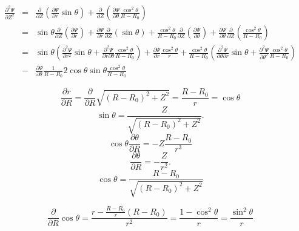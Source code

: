 \documentclass{article}
\begin{document}
\begin{eqnarray}
  \frac{\partial^2 \Psi}{\partial Z^2} & = & \frac{\partial}{\partial Z}
  \left( \frac{\partial \Psi}{\partial r} \sin \theta \right) +
  \frac{\partial}{\partial Z} \left( \frac{\partial \Psi}{\partial \theta} 
  \frac{\cos^2 \theta}{R - R_0} \right) \nonumber\\
  & = & \sin \theta \frac{\partial}{\partial Z} \left( \frac{\partial
  \Psi}{\partial r} \right) + \frac{\partial \Psi}{\partial r} 
  \frac{\partial}{\partial Z} (\sin \theta) + \frac{\cos^2 \theta}{R - R_0} 
  \frac{\partial}{\partial Z} \left( \frac{\partial \Psi}{\partial \theta} 
  \right) + \frac{\partial \Psi}{\partial \theta} \frac{\partial}{\partial Z}
  \left( \frac{\cos^2 \theta}{R - R_0} \right) \nonumber\\
  & = & \sin \theta \left( \frac{\partial^2 \Psi}{\partial r^2} \sin \theta +
  \frac{\partial^2 \Psi}{\partial r \partial \theta}  \frac{\cos^2 \theta}{R -
  R_0} \right) + \frac{\partial \Psi}{\partial r}  \frac{\cos^2 \theta}{r} +
  \frac{\cos^2 \theta}{R - R_0}  \left( \frac{\partial^2 \Psi}{\partial \theta
  \partial r} \sin \theta + \frac{\partial^2 \Psi}{\partial \theta^2} 
  \frac{\cos^2 \theta}{R - R_0} \right) \nonumber\\
  & - & \frac{\partial \Psi}{\partial \theta}  \frac{1}{R - R_0} 2 \cos
  \theta \sin \theta \frac{\cos^2 \theta}{R - R_0}  \label{9-17-e1}
\end{eqnarray}



\begin{equation}
  \frac{\partial r}{\partial R} = \frac{\partial}{\partial R} \sqrt{(R -
  R_0)^2 + Z^2} = \frac{R - R_0}{r} = \cos \theta
\end{equation}
\[ \sin \theta = \frac{Z}{\sqrt{(R - R_0)^2 + Z^2}} . \]
\[ \cos \theta \frac{\partial \theta}{\partial R} = - Z \frac{R - R_0}{r^3} \]
\begin{equation}
  \frac{\partial \theta}{\partial R} = - \frac{Z}{r^2} .
\end{equation}
\[ \cos \theta = \frac{R - R_0}{\sqrt{(R - R_0)^2 + Z^2}} \]

\begin{equation}
  \frac{\partial}{\partial R} \cos \theta = \frac{r - \frac{R - R_0}{r} (R -
  R_0)}{r^2} = \frac{1 - \cos^2 \theta}{r} = \frac{\sin^2 \theta}{r}
\end{equation}
\end{document}
